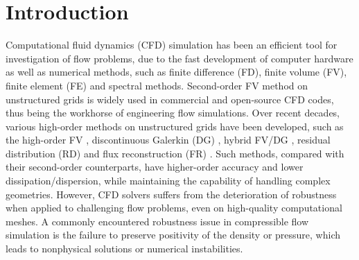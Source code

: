 

\section{Introduction}
\label{sec:intro}

Computational fluid dynamics (CFD) simulation has been an efficient tool for investigation of flow problems, due to the fast development of computer hardware as well as numerical methods, such as finite difference (FD), finite volume (FV), finite element (FE) and spectral methods. Second-order FV method on unstructured grids \cite{van1979towards} is widely used in commercial and open-source CFD codes, thus being the workhorse of engineering flow simulations. Over recent decades, various high-order methods on unstructured grids have been developed, such as the high-order FV \cite{ollivier1997quasi_ENO,dumbser2007quadrature_WENO,wang2017compact_VR}, discontinuous Galerkin (DG) \cite{reed1973triangularDG,cockburn2001rungeDG}, hybrid FV/DG \cite{dumbser2008unified,li2022reconstructed,zhang2012class1}, residual distribution (RD)  \cite{abgrall2003construction} and flux reconstruction (FR) \cite{huynh2007flux,vincent2011new,wang2009unifying}. Such methods, compared with their second-order counterparts, have higher-order accuracy and lower dissipation/dispersion, while maintaining the capability of handling complex geometries. 
However, CFD solvers suffers from the deterioration of robustness when applied to challenging flow problems, even on high-quality computational meshes. A commonly encountered robustness issue in compressible flow simulation is the failure to preserve positivity of the density or pressure, which leads to nonphysical solutions or numerical instabilities.

